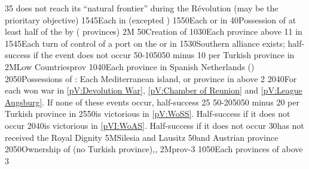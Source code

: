 {}{35}{ does not reach its ``natural frontier'' during the
  Révolution (may be the prioritary objective)}%
%
%
{15}{45}{Each \COL in  (excepted )}%
%
%
{15}{50}{Each \COL or \TP in }%
%
 
%
%
{}{40}{Possession of at least half of the \payshongrie by \AUSaus (
  provinces)}%
%
\EUobjective2M{}{}%
{}{50}{Creation of }%
%
%
{10}{30}{Each province above 11 in \paysmajeurAutriche}%
%
%
{15}{45}{Each turn of control of a port on the \seazoneBaltique or in
  \payshanse}%
%
%
{15}{30}{Southern \HRE alliance exists; half-success if the event does not
  occur}%
%
%
%
{50-10}{50}{50 \VPs minus 10 \VPs per Turkish province in \payshongrie}%
%
\EUobjective2M{Low Countries}{prov}%
{10}{40}{Each province in Spanish Netherlands (\regionBelgique)}%
%
%
{20}{50}{Possessions of : Each Mediterranean island, or province
  in  above 2}%
%
%
{20}{40}{For each won war in \ref{pV:Devolution War}, \ref{pV:Chamber of
    Reunion} and \ref{pV:League Augsburg}. If none of these events occur,
  half-success}%
%
%
{}{25}{}%
%
%
%
{50-20}{50}{50 \VPs minus 20 \VPs per Turkish province in \payshongrie}%
%
%
{25}{50}{\AUS is victorious in \ref{pV:WoSS}. Half-success if it does not
  occur}%
%
%
{20}{40}{\AUS is victorious in \ref{pVI:WoAS}. Half-success if it does not
  occur}%
%
%
{}{30}{\paysmajeurPrusse has not received the Royal Dignity}%
%
\EUobjective5M{Silesia and Lausitz}{}%
{}{50}{\provinceSilesie and \provinceLausitz Austrian province}%
%
%
%
{20}{50}{Ownership of \payshongrie (no Turkish
  province),\provinceBosna,\provinceSerbia}%
%
\EUobjective2M{\paysnaples}{prov-3}%
{10}{50}{Each provinces of \paysnaples above 3}%
